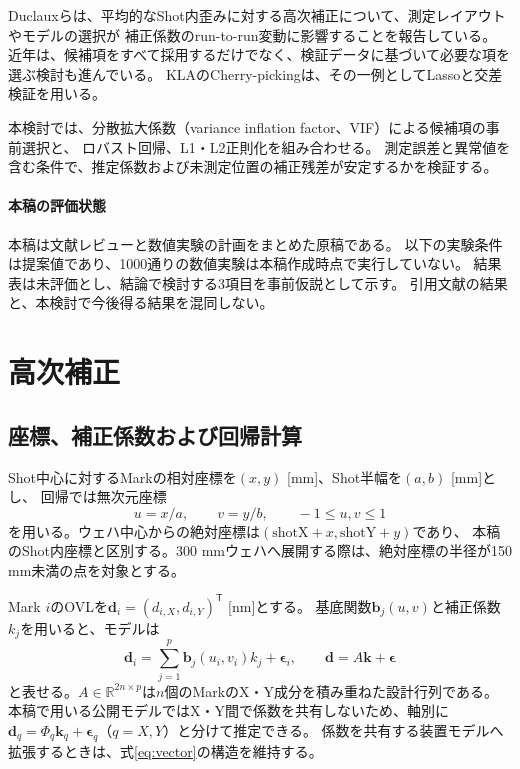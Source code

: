 \documentclass[11pt,a4paper]{ltjsarticle}
\newcommand{\R}{\mathbb{R}}
\begin{document}
Duclauxらは、平均的なShot内歪みに対する高次補正について、測定レイアウトやモデルの選択が
補正係数のrun-to-run変動に影響することを報告している\cite{nicolas2020}。
近年は、候補項をすべて採用するだけでなく、検証データに基づいて必要な項を選ぶ検討も進んでいる。
KLAのCherry-pickingは、その一例としてLassoと交差検証を用いる\cite{cherry2025}。

本検討では、分散拡大係数（variance inflation factor、VIF）による候補項の事前選択と、
ロバスト回帰、L1・L2正則化を組み合わせる。
測定誤差と異常値を含む条件で、推定係数および未測定位置の補正残差が安定するかを検証する。

\paragraph{本稿の評価状態}
本稿は文献レビューと数値実験の計画をまとめた原稿である。
以下の実験条件は提案値であり、1000通りの数値実験は本稿作成時点で実行していない。
結果表は未評価とし、結論で検討する3項目を事前仮説として示す。
引用文献の結果と、本検討で今後得る結果を混同しない。

\section{高次補正}
\subsection{座標、補正係数および回帰計算}
Shot中心に対するMarkの相対座標を$(x,y)$ [mm]、Shot半幅を$(a,b)$ [mm]とし、
回帰では無次元座標
\begin{equation}
 u=x/a,\qquad v=y/b,\qquad -1\leq u,v\leq 1
 \label{eq:coordinate}
\end{equation}
を用いる。ウェハ中心からの絶対座標は$(\mathrm{shotX}+x,\mathrm{shotY}+y)$であり、
本稿のShot内座標と区別する。300 mmウェハへ展開する際は、絶対座標の半径が150 mm未満の点を対象とする。

Mark $i$のOVLを$\bm d_i=(d_{i,X},d_{i,Y})^\mathsf T$ [nm]とする。
基底関数$\bm b_j(u,v)$と補正係数$k_j$を用いると、モデルは
\begin{equation}
 \bm d_i=\sum_{j=1}^{p}\bm b_j(u_i,v_i)k_j+\bm\epsilon_i,
 \qquad \bm d=A\bm k+\bm\epsilon
 \label{eq:vector}
\end{equation}
と表せる。$A\in\R^{2n\times p}$は$n$個のMarkのX・Y成分を積み重ねた設計行列である。
本稿で用いる公開モデルではX・Y間で係数を共有しないため、軸別に
$\bm d_q=\Phi_q\bm k_q+\bm\epsilon_q$（$q=X,Y$）と分けて推定できる。
係数を共有する装置モデルへ拡張するときは、式\eqref{eq:vector}の構造を維持する。
\end{document}
